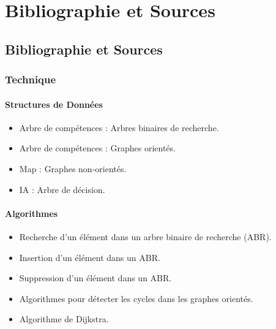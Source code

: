 \documentclass{report}
\begin{document}
\newpage
\part{Bibliographie et Sources}
\chapter{Bibliographie et Sources}
\section{Technique}

\subsection{Structures de Données}
\begin{itemize}
    \item Arbre de compétences : Arbres binaires de recherche.
    \item Arbre de compétences : Graphes orientés.
    \item Map : Graphes non-orientés.
    \item IA : Arbre de décision.
\end{itemize}

\subsection{Algorithmes}
\begin{itemize}
    \item Recherche d'un élément dans un arbre binaire de recherche (ABR).
    \item Insertion d'un élément dans un ABR.
    \item Suppression d'un élément dans un ABR.
    \item Algorithmes pour détecter les cycles dans les graphes orientés.
    \item Algorithme de Dijkstra.
\end{itemize}
\end{document}
